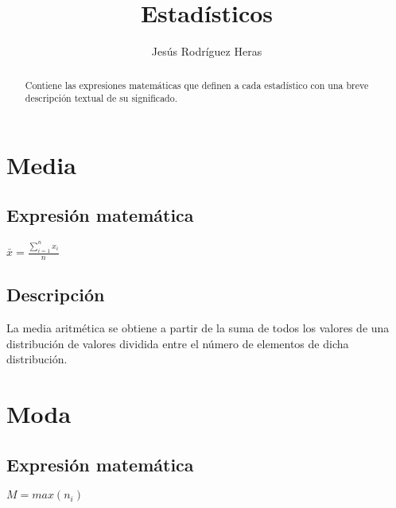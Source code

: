 \documentclass[12pt,letterpaper]{article}
\title{Estadísticos}
\author{Jesús Rodríguez Heras}
\begin{document}
	
	\maketitle
	\begin{abstract} %
		\begin{center}
			Contiene las expresiones matemáticas que definen a cada estadístico con una breve descripción textual de su significado.
		\end{center}
	\end{abstract}
	\thispagestyle{empty}
	\newpage
	
	\tableofcontents
	\newpage
	
	
	
	
	\lstset{language=bash, numbers=left, numberstyle=\tiny, numbersep=10pt, firstnumber=1, stepnumber=1, basicstyle=\small\ttfamily, tabsize=1, extendedchars=true, inputencoding=latin1}

\section{Media}
\subsection{Expresión matemática}
\noindent
\begin{center}
	$\bar{x}=\frac{\sum_{i=1}^{n}x_{i}}{n}$
\end{center}

\subsection{Descripción}
\noindent
La media aritmética se obtiene a partir de la suma de todos los valores de una distribución de valores dividida entre el número de elementos de dicha distribución.

\section{Moda}
\subsection{Expresión matemática}
\noindent
\begin{center}
	$M=max(n_{i})$
\end{center}
\end{document}
